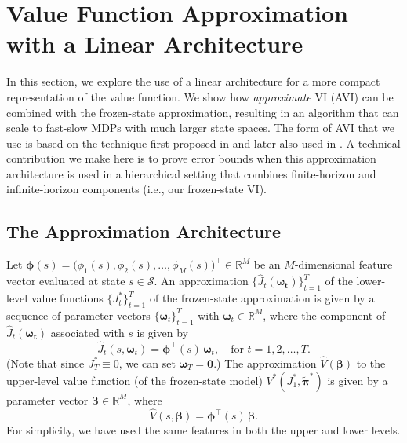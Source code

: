 \documentclass[11pt, notitlepage]{article}
\newcommand{\R}{\mathbb{R}}
\newcommand{\1}{\mathbbm{1}}
\begin{document}
\section{Value Function Approximation with a Linear Architecture} \label{sec:avi}

In this section, we explore the use of a linear architecture for a more compact representation of the value function. We show how \emph{approximate} VI (AVI) can be combined with the frozen-state approximation, resulting in an algorithm that can scale to fast-slow MDPs with much larger state spaces. The form of AVI that we use is based on the technique first proposed in \cite{tsitsiklis1996feature} and later also used in \cite{zanette2019limiting}. A technical contribution we make here is to prove error bounds when this approximation architecture is used in a hierarchical setting that combines finite-horizon and infinite-horizon components (i.e., our frozen-state VI).


\subsection{The Approximation Architecture}
Let $\boldsymbol{\phi}(s) = \bigl(\phi_1(s), \phi_2(s), \ldots, \phi_M(s)\bigr)^\intercal \in \R^M$ be an $M$-dimensional feature vector evaluated at state $s \in \mathcal S$. An approximation $\{\hat{J}_t(\boldsymbol{\omega_t})\}_{t=1}^{T}$ of the lower-level value functions $\{J_t^*\}_{t=1}^{T}$ of the frozen-state approximation is given by a sequence of parameter vectors $\{\boldsymbol{\omega}_t\}_{t=1}^T$ with $\boldsymbol{\omega}_t \in \mathbb R^M$, where the component of $\hat{J}_t(\boldsymbol{\omega_t})$ associated with $s$ is given by
\begin{equation*}
    \hat{J}_t(s,\boldsymbol{\omega}_t) = \boldsymbol{\phi}^\intercal(s) \, \boldsymbol{\omega}_t, \quad \text{for } t = 1, 2, \ldots, T.
\end{equation*}
(Note that since $J_T^* \equiv 0$, we can set $\boldsymbol{\omega}_T = \boldsymbol{0}$.) The approximation $\hat{V}(\boldsymbol{\beta})$ to the upper-level value function (of the frozen-state model) $V^*(J_1^*,\tilde{\boldsymbol{\pi}}^*)$ is given by a parameter vector $\boldsymbol{\beta} \in \mathbb R^M$, where
\begin{equation*}
    \hat{V}(s,\boldsymbol{\beta}) = \boldsymbol{\phi}^\intercal(s) \, \boldsymbol{\beta}.
\end{equation*}
For simplicity, we have used the same features in both the upper and lower levels.
\end{document}
